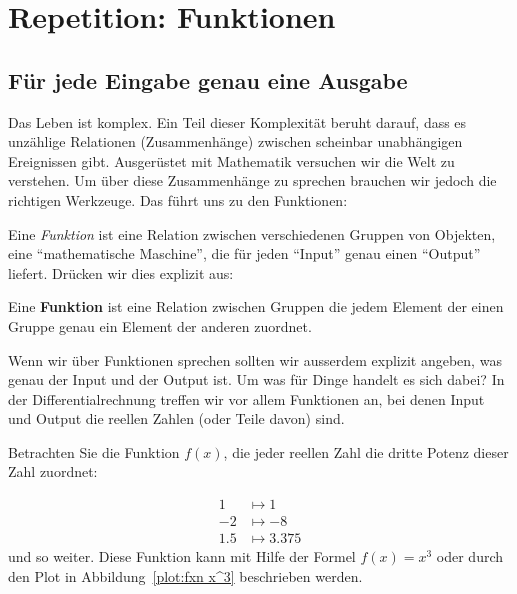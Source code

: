 \chapter{Repetition: Funktionen}

\section{Für jede Eingabe genau eine Ausgabe}

Das Leben ist komplex. Ein Teil dieser Komplexität beruht darauf, dass es unzählige Relationen (Zusammenhänge) zwischen scheinbar unabhängigen Ereignissen gibt. Ausgerüstet mit Mathematik versuchen wir die Welt zu verstehen. Um über diese Zusammenhänge zu sprechen brauchen wir jedoch die richtigen Werkzeuge. Das führt uns zu den Funktionen:


Eine \textit{Funktion} ist eine Relation zwischen verschiedenen Gruppen von Objekten, eine ``mathematische Maschine'', die für jeden ``Input'' genau einen ``Output'' liefert. Drücken wir dies explizit aus:


\begin{definition}
Eine \textbf{Funktion} ist eine Relation zwischen Gruppen die jedem Element der einen Gruppe genau ein Element der anderen zuordnet.
\end{definition}

Wenn wir über Funktionen sprechen sollten wir ausserdem explizit angeben, was genau der Input und der Output ist. Um was für Dinge handelt es sich dabei? In der Differentialrechnung treffen wir vor allem Funktionen an, bei denen Input und Output die reellen Zahlen (oder Teile davon) sind.


\begin{example}
Betrachten Sie die Funktion $f(x)$, die jeder reellen Zahl die dritte Potenz dieser Zahl zuordnet:

\begin{align*}
1 &\mapsto 1\\
-2 &\mapsto -8\\
1.5 &\mapsto 3.375
\end{align*}
und so weiter. Diese Funktion kann mit Hilfe der Formel $f(x)=x^3$ oder durch den Plot in Abbildung~\ref{plot:fxn x^3} beschrieben werden.
\end{example}

